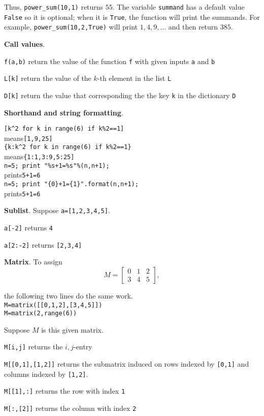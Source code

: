 \documentclass{article}
\newcommand{\heading}[1]{\medskip\textbf{#1}.}
\newenvironment{lwdes}{\begin{description}[leftmargin=1.7cm,align=left,labelwidth=1.5cm]}{\end{description}}
\begin{document}
\begin{multicols}{2}
Thus, \verb|power_sum(10,1)| returns $55$.  The variable \texttt{summand} has a default value \texttt{False} so it is optional; when it is \texttt{True}, the function will print the summands.  For example, \verb|power_sum(10,2,True)| will print $1,4,9,\ldots$ and then return $385$.


\heading{Call values}
\begin{lwdes}
\item[\texttt{f(a,b)}] return the value of the function \texttt{f} with given inputs \texttt{a} and \texttt{b}
\item[\texttt{L[k]}] return the value of the $k$-th element in the list \texttt{L}
\item[\texttt{D[k]}] return the value that corresponding the the key \texttt{k} in the dictionary \texttt{D}
\end{lwdes}

\heading{Shorthand and string formatting}

\begin{obeylines}
\verb|[k^2 for k in range(6) if k%2==1]|
means\hfill \verb|[1,9,25]|
\verb|{k:k^2 for k in range(6) if k%2==1}|
means\hfill \verb|{1:1,3:9,5:25]|
\verb|n=5; print "%s+1=%s"%(n,n+1);|
prints\hfill \verb|5+1=6|
\verb|n=5; print "{0}+1={1}".format(n,n+1);|
prints\hfill \verb|5+1=6|
\end{obeylines}

\heading{Sublist}
Suppose \texttt{a=[1,2,3,4,5]}.
\begin{lwdes}
\item[\texttt{a[-2]}] returns \texttt{4}
\item[\texttt{a[2:-2]}] returns \texttt{[2,3,4]}
\end{lwdes}

\heading{Matrix}
To assign 
\[M=\begin{bmatrix}0&1&2\\3&4&5\end{bmatrix},\]
\begin{obeylines}
the following two lines do the same work.
\verb|M=matrix([[0,1,2],[3,4,5]])|
\verb|M=matrix(2,range(6))|
\end{obeylines}

Suppose $M$ is this given matrix.
\begin{lwdes}
\item[\texttt{M[i,j]}] returns the $i,j$-entry
\item[\texttt{M[[0,1],[1,2]]}] returns the submatrix induced on rows indexed by \texttt{[0,1]} and columns indexed by \texttt{[1,2]}.
\item[\texttt{M[[1],:]}] returns the row with index \texttt{1}
\item[\texttt{M[:,[2]]}] returns the column with index \texttt{2}
\end{lwdes}


\end{multicols}
\end{document}
